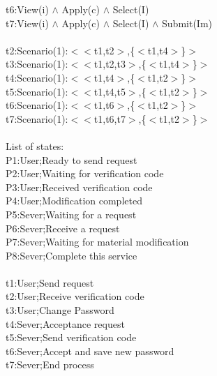 \documentclass[runningheads]{llncs}
\begin{document}
t6:View(i) $\wedge$ Apply(c) $\wedge$ Select(I)\\
t7:View(i) $\wedge$ Apply(c) $\wedge$ Select(I) $\wedge$ Submit(Im)\\
\\
t2:Scenario(1):$<$$<$t1,t2$>$,\{$<$t1,t4$>$\}$>$\\
t3:Scenario(1):$<$$<$t1,t2,t3$>$,\{$<$t1,t4$>$\}$>$\\
t4:Scenario(1):$<$$<$t1,t4$>$,\{$<$t1,t2$>$\}$>$\\
t5:Scenario(1):$<$$<$t1,t4,t5$>$,\{$<$t1,t2$>$\}$>$\\
t6:Scenario(1):$<$$<$t1,t6$>$,\{$<$t1,t2$>$\}$>$\\
t7:Scenario(1):$<$$<$t1,t6,t7$>$,\{$<$t1,t2$>$\}$>$\\
\\
List of states:\\
P1:User;Ready to send request\\
P2:User;Waiting for verification code\\
P3:User;Received verification code\\
P4:User;Modification completed\\
P5:Sever;Waiting for a request\\
P6:Sever;Receive a request\\
P7:Sever;Waiting for material modification\\
P8:Sever;Complete this service\\
\\
t1:User;Send request\\
t2:User;Receive verification code\\
t3:User;Change Password\\
t4:Sever;Acceptance request\\
t5:Sever;Send verification code\\
t6:Sever;Accept and save new password\\
t7:Sever;End process\\
\end{document}
